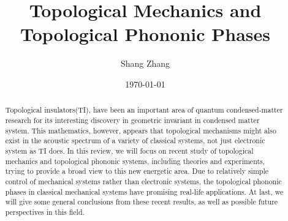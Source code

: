 \documentclass[aps,pre,preprint,groupedaddress]{revtex4-1}
\begin{document}

\title{\textbf{Topological Mechanics and Topological Phononic Phases}}


\author{Shang Zhang}


\date{\today}

\begin{abstract}
Topological insulators(TI), have been an important area of quantum condensed-matter research for its interesting discovery in geometric invariant in condensed matter system. This mathematics, however, appears that topological mechanisms might also exist in the acoustic spectrum of a variety of classical systems, not just electronic system as TI does. In this review, we will focus on recent study of topological mechanics and topological phononic systems, including theories and experiments, trying to provide a broad view to this new energetic area. Due to relatively simple control of mechanical systems rather than electronic systems, the topological phononic phases in classical mechanical systems have promising real-life applications. At last, we will give some general conclusions from these recent results, as well as possible future perspectives in this field.
\end{abstract}
\end{document}
